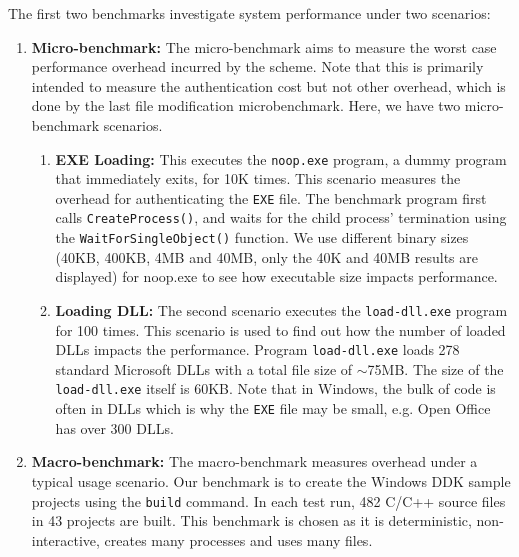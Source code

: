 
The first two benchmarks investigate system performance under
two scenarios:
\begin{enumerate}
\item {\bf Micro-benchmark:}
The micro-benchmark aims to measure the worst case performance overhead
incurred by the scheme. 
Note that this is primarily intended to measure the authentication cost
but not other overhead, which is done by the last file modification 
microbenchmark.
Here, we have two micro-benchmark scenarios.
\begin{enumerate}
\item {\bf EXE Loading:}
This executes the {\tt noop.exe} program, a dummy program
that immediately exits, for 10K times.
This scenario measures the overhead for authenticating the
{\tt EXE} file.
The benchmark program first calls {\tt CreateProcess()},
and waits for the child process' termination using the {\tt WaitForSingleObject()} function.
We use different binary sizes (40KB, 400KB, 4MB and 40MB, only the 40K and 40MB
results are displayed)
for noop.exe to see how executable size impacts performance.
\item {\bf Loading DLL:}
The second scenario executes the {\tt load-dll.exe} program for 100 times.
This scenario is used to find out how the number of loaded DLLs impacts the performance.
Program {\tt load-dll.exe} loads 278 standard Microsoft
DLLs with a total file size of $\sim$75MB.
The size of the {\tt load-dll.exe} itself is 60KB.
Note that in Windows, the bulk of code is often in DLLs which is why the 
{\tt EXE} file may be small, e.g. Open Office has over 300 DLLs.
\end{enumerate}

\item {\bf Macro-benchmark:}
The macro-benchmark measures overhead under a typical usage scenario.
Our benchmark is to create the Windows DDK sample projects
using the {\tt build} command.
In each test run, 482 C/C++ source files in 43 projects are built.
This benchmark is chosen as it is deterministic, non-interactive, creates
many processes and uses many files.
\end{enumerate}

